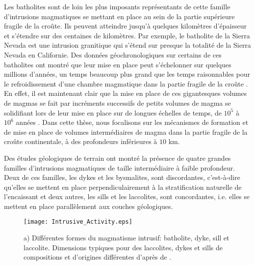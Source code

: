 Les batholites sont de loin les plus imposants représentants de cette
famille d'intrusions magmatiques se mettant en place au sein de la
partie supérieure fragile de la croûte. Ils peuvent atteindre jusqu'à
quelques kilomètres d'épaisseur et s'étendre sur des centaines de
kilomètres. Par exemple, le batholite de la Sierra Nevada est une
intrusion granitique qui s'étend sur presque la totalité de la Sierra
Nevada en Californie. Des données géochronologiques sur certains de
ces batholites ont montré que leur mise en place peut s'échelonner sur
quelques millions d'années, un temps beaucoup plus grand que les temps
raisonnables pour le refroidissement d'une chambre magmatique dans la
partie fragile de la croûte \citep{Glazner:2004gv}. En effet, il est
maintenant clair que la mise en place de ces gigantesques volumes de
magmas se fait par incréments successifs de petits volumes de magma se
solidifiant lors de leur mise en place sur de longues échelles de
temps, de $10^5$ à $10^6$ années
\citep{Petford:2000cc,Glazner:2004gv}. Dans cette thèse, nous
focalisons sur les mécanismes de formation et de mise en place de
volumes intermédiaires de magma dans la partie fragile de la croûte
continentale, à des profondeurs inférieures à $10$ km.

Des études géologiques de terrain ont montré la présence de quatre
grandes familles d'intrusions magmatiques de taille intermédiaire à
faible profondeur. Deux de ces familles, les dykes et les bysmalites,
sont discordantes, c'est-à-dire qu'elles se mettent en place
perpendiculairement à la stratification naturelle de l'encaissant et
deux autres, les sills et les laccolites, sont concordantes,
i.e. elles se mettent en place parallèlement aux couches géologiques.

\begin{figure}[htpb]
 \begin{center}
 \graphicspath{ {/Users/thorey/Documents/These/Manuscript/Figure/Chapter1/} }
 \texttt{[image: Intrusive\_Activity.eps]}
 \caption{a) Différentes formes du magmatisme intrusif: batholite,
 dyke, sill et laccolite. Dimensions typiques pour des
 laccolites, dykes et sills de compositions et d'origines
 différentes d'après de \citet{Cruden:tg}. }
 \label{C1-Dimension}
 \end{center}
\end{figure}

